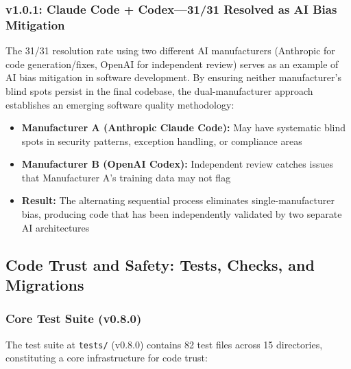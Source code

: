 \subsubsection{v1.0.1: Claude Code + Codex---31/31 Resolved as AI Bias Mitigation}

The 31/31 resolution rate using two different AI manufacturers (Anthropic for code generation/fixes, OpenAI for independent review) serves as an example of AI bias mitigation in software development. By ensuring neither manufacturer's blind spots persist in the final codebase, the dual-manufacturer approach establishes an emerging software quality methodology:
\begin{itemize}
  \item \textbf{Manufacturer A (Anthropic Claude Code):} May have systematic blind spots in security patterns, exception handling, or compliance areas
  \item \textbf{Manufacturer B (OpenAI Codex):} Independent review catches issues that Manufacturer A's training data may not flag
  \item \textbf{Result:} The alternating sequential process eliminates single-manufacturer bias, producing code that has been independently validated by two separate AI architectures
\end{itemize}

\subsection{Code Trust and Safety: Tests, Checks, and Migrations}
\label{sec:codetrust}

\subsubsection{Core Test Suite (v0.8.0)}

The test suite at \texttt{tests/} (v0.8.0) contains 82 test files across 15 directories, constituting a core infrastructure for code trust:

